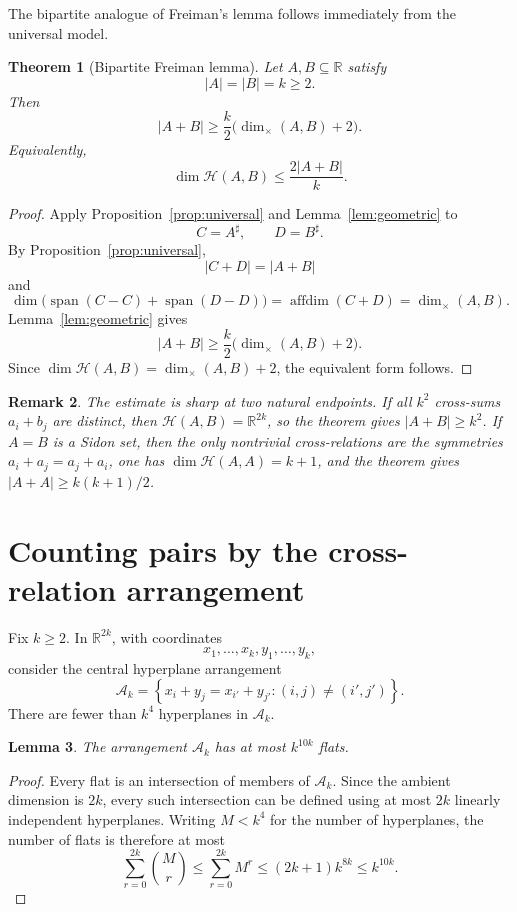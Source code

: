 \documentclass[11pt]{article}
\newtheorem{theorem}{Theorem}[section]
\newtheorem{lemma}[theorem]{Lemma}
\newtheorem{remark}[theorem]{Remark}
\newcommand{\R}{\mathbb{R}}
\newcommand{\cH}{\mathcal{H}}
\newcommand{\cA}{\mathcal{A}}
\newcommand{\affdim}{\operatorname{affdim}}
\newcommand{\spann}{\operatorname{span}}
\newcommand{\dimx}{\dim_{\times}}
\begin{document}
The bipartite analogue of Freiman's lemma follows immediately from the universal model.

\begin{theorem}[Bipartite Freiman lemma]\label{thm:bip-freiman}
Let $A,B\subseteq\R$ satisfy
\[
 |A|=|B|=k\ge2.
\]
Then
\[
 |A+B|\ge \frac{k}{2}\bigl(\dimx(A,B)+2\bigr).
\]
Equivalently,
\[
 \dim \cH(A,B)\le \frac{2|A+B|}{k}.
\]
\end{theorem}

\begin{proof}
Apply Proposition~\ref{prop:universal} and Lemma~\ref{lem:geometric} to
\[
 C=A^\sharp,\qquad D=B^\sharp.
\]
By Proposition~\ref{prop:universal},
\[
 |C+D|=|A+B|
\]
and
\[
 \dim\bigl(\spann(C-C)+\spann(D-D)\bigr)
 =\affdim(C+D)=\dimx(A,B).
\]
Lemma~\ref{lem:geometric} gives
\[
 |A+B|\ge \frac{k}{2}\bigl(\dimx(A,B)+2\bigr).
\]
Since $\dim\cH(A,B)=\dimx(A,B)+2$, the equivalent form follows.
\end{proof}

\begin{remark}\label{rem:endpoints}
The estimate is sharp at two natural endpoints.  If all $k^2$ cross-sums $a_i+b_j$ are distinct, then $\cH(A,B)=\R^{2k}$, so the theorem gives $|A+B|\ge k^2$.  If $A=B$ is a Sidon set, then the only nontrivial cross-relations are the symmetries $a_i+a_j=a_j+a_i$, one has $\dim\cH(A,A)=k+1$, and the theorem gives $|A+A|\ge k(k+1)/2$.
\end{remark}

\section{Counting pairs by the cross-relation arrangement}

Fix $k\ge2$.  In $\R^{2k}$, with coordinates
\[
 x_1,\ldots,x_k,y_1,\ldots,y_k,
\]
consider the central hyperplane arrangement
\[
 \cA_k=\left\{
 x_i+y_j=x_{i'}+y_{j'}:
 (i,j)\ne(i',j')
 \right\}.
\]
There are fewer than $k^4$ hyperplanes in $\cA_k$.

\begin{lemma}\label{lem:flats}
The arrangement $\cA_k$ has at most $k^{10k}$ flats.
\end{lemma}

\begin{proof}
Every flat is an intersection of members of $\cA_k$.  Since the ambient dimension is $2k$, every such intersection can be defined using at most $2k$ linearly independent hyperplanes.  Writing $M<k^4$ for the number of hyperplanes, the number of flats is therefore at most
\[
 \sum_{r=0}^{2k}\binom Mr
 \le \sum_{r=0}^{2k}M^r
 \le (2k+1)k^{8k}
 \le k^{10k}.
\]
\end{proof}
\end{document}
